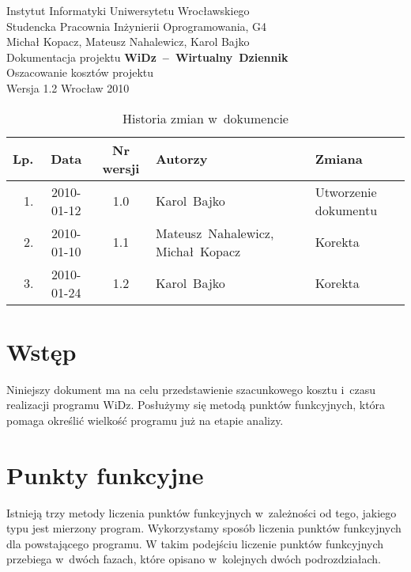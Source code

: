 \documentclass[12pt,leqno,twoside]{mwart}
\begin{document}
\begin{titlepage}
\begin{center}
Instytut Informatyki Uniwersytetu Wrocławskiego \\
Studencka Pracownia Inżynierii Oprogramowania, G4 \\
\vspace{4cm}
\Large Michał Kopacz, Mateusz Nahalewicz, Karol Bajko \\
\vspace{0.5cm}
\huge Dokumentacja projektu \mbox{\textbf{WiDz -- Wirtualny Dziennik}} \\ \Large Oszacowanie kosztów projektu\\
\vspace{1cm}
\normalsize Wersja 1.2
\vfill
\normalsize Wrocław 2010
\end{center}
\end{titlepage}

\newpage
\vfill
\renewcommand*{\tablename}{Tabela}
\begin{table}[tb]
	\centering
	\caption{Historia zmian w~dokumencie}
		\begin{tabular}{|r|c|c|p{}|l|}
		\hline
		Lp. 	& Data       & Nr wersji 	& Autorzy           		& Zmiana \\ \hline
		1.   	& 2010-01-12 & 1.0       	& \mbox{Karol Bajko} & Utworzenie dokumentu \\ \hline
		2.   	& 2010-01-10 & 1.1       	& \mbox{Mateusz Nahalewicz}, \mbox{Michał Kopacz} & Korekta \\ \hline
		3.   	& 2010-01-24 & 1.2       	& \mbox{Karol Bajko} & Korekta \\ \hline
		\end{tabular}
\end{table}

\tableofcontents
\newpage

\section{Wstęp}
\noindent Niniejszy dokument ma na celu przedstawienie szacunkowego kosztu i~czasu realizacji programu WiDz. Posłużymy się metodą punktów funkcyjnych, która pomaga określić wielkość programu już na etapie analizy. \\

\section{Punkty funkcyjne}
\noindent Istnieją trzy metody liczenia punktów funkcyjnych w~zależności od tego, jakiego typu jest mierzony program. Wykorzystamy sposób liczenia punktów funkcyjnych dla powstającego programu. W takim podejściu liczenie punktów funkcyjnych przebiega w~dwóch fazach, które opisano w~kolejnych dwóch podrozdziałach.\\
\end{document}
